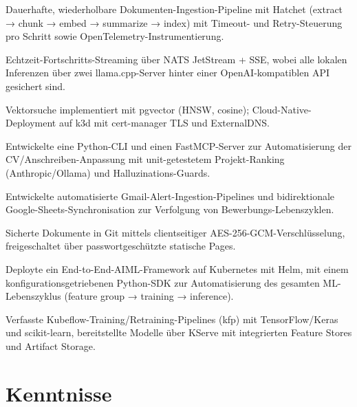\documentclass[10pt,a4paper]{resume}
\begin{document}
\bullets
  \item Dauerhafte, wiederholbare Dokumenten-Ingestion-Pipeline mit Hatchet (extract → chunk → embed → summarize → index) mit Timeout- und Retry-Steuerung pro Schritt sowie OpenTelemetry-Instrumentierung.
  \item Echtzeit-Fortschritts-Streaming über NATS JetStream + SSE, wobei alle lokalen Inferenzen über zwei llama.cpp-Server hinter einer OpenAI-kompatiblen API gesichert sind.
  \item Vektorsuche implementiert mit pgvector (HNSW, cosine); Cloud-Native-Deployment auf k3d mit cert-manager TLS und ExternalDNS.
\bulletsend
\vspace{1.0pt}
\bullets
  \item Entwickelte eine Python-CLI und einen FastMCP-Server zur Automatisierung der CV/Anschreiben-Anpassung mit unit-getestetem Projekt-Ranking (Anthropic/Ollama) und Halluzinations-Guards.
  \item Entwickelte automatisierte Gmail-Alert-Ingestion-Pipelines und bidirektionale Google-Sheets-Synchronisation zur Verfolgung von Bewerbungs-Lebenszyklen.
  \item Sicherte Dokumente in Git mittels clientseitiger AES-256-GCM-Verschlüsselung, freigeschaltet über passwortgeschützte statische Pages.
\bulletsend
\vspace{1.0pt}
\bullets
  \item Deployte ein End-to-End-AIML-Framework auf Kubernetes mit Helm, mit einem konfigurationsgetriebenen Python-SDK zur Automatisierung des gesamten ML-Lebenszyklus (feature group → training → inference).
  \item Verfasste Kubeflow-Training/Retraining-Pipelines (kfp) mit TensorFlow/Keras und scikit-learn, bereitstellte Modelle über KServe mit integrierten Feature Stores und Artifact Storage.
\bulletsend

\section{Kenntnisse}
\end{document}
